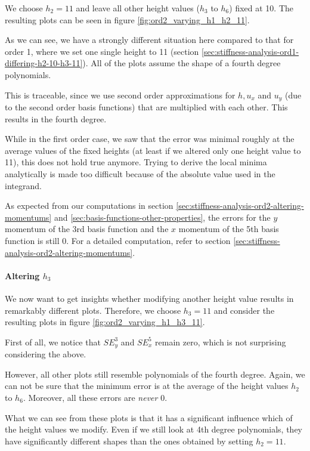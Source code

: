 \documentclass{article}
\begin{document}
We choose $h_2=11$ and leave all other height values ($h_3$ to $h_6$) fixed at 10. The resulting plots can be seen in figure \ref{fig:ord2_varying_h1_h2_11}.



As we can see, we have a strongly different situation here compared to that for order 1, where we set one single height to 11 (section \ref{sec:stiffness-analysis-ord1-differing-h2-10-h3-11}). All of the plots assume the shape of a fourth degree polynomials.

This is traceable, since we use second order approximations for $h, u_x$ and $u_y$ (due to the second order basis functions) that are multiplied with each other. This results in the fourth degree.

While in the first order case, we saw that the error was minimal roughly at the average values of the fixed heights (at least if we altered only one height value to 11), this does not hold true anymore. Trying to derive the local minima analytically is made too difficult because of the absolute value used in the integrand.

As expected from our computations in section \ref{sec:stiffness-analysis-ord2-altering-momentums} and \ref{sec:basis-functions-other-properties}, the errors for the $y$ momentum of the 3rd basis function and the $x$ momentum of the 5th basis function is still 0. For a detailed computation, refer to section \ref{sec:stiffness-analysis-ord2-altering-momentums}.

\paragraph{\texorpdfstring{Altering $h_3$}{Altering h3}}

We now want to get insights whether modifying another height value results in remarkably different plots. Therefore, we choose $h_3=11$ and consider the resulting plots in figure \ref{fig:ord2_varying_h1_h3_11}.



First of all, we notice that $SE_y^3$ and $SE_x^5$ remain zero, which is not surprising considering the above.

However, all other plots still resemble polynomials of the fourth degree. Again, we can not be sure that the minimum error is at the average of the height values $h_2$ to $h_6$. Moreover, all these errors are \emph{never} 0.

What we can see from these plots is that it has a significant influence which of the height values we modify. Even if we still look at 4th degree polynomials, they have significantly different shapes than the ones obtained by setting $h_2=11$.
\end{document}
